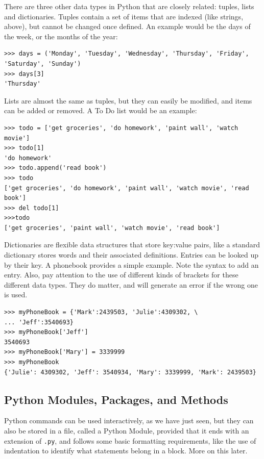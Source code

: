 There are three other data types in Python that are closely related: tuples, lists and dictionaries.  Tuples contain a set of items that are indexed (like strings, above), but cannot be changed once defined.  An example would be the days of the week, or the months of the year:

\begin{lstlisting}
>>> days = ('Monday', 'Tuesday', 'Wednesday', 'Thursday', 'Friday', 'Saturday', 'Sunday')
>>> days[3]
'Thursday'
\end{lstlisting}

Lists are almost the same as tuples, but they can easily be modified, and items can be added or removed. A To Do list would be an example:

\begin{lstlisting}
>>> todo = ['get groceries', 'do homework', 'paint wall', 'watch movie']
>>> todo[1]
'do homework'
>>> todo.append('read book')
>>> todo
['get groceries', 'do homework', 'paint wall', 'watch movie', 'read book']
>>> del todo[1]
>>>todo
['get groceries', 'paint wall', 'watch movie', 'read book']
\end{lstlisting}

Dictionaries are flexible data structures that store key:value pairs, like a standard dictionary stores words and their associated definitions.  Entries can be looked up by their key.  A phonebook provides a simple example.  Note the syntax to add an entry.  Also, pay attention to the use of different kinds of brackets for these different data types.  They do matter, and will generate an error if the wrong one is used.

\begin{lstlisting}
>>> myPhoneBook = {'Mark':2439503, 'Julie':4309302, \
... 'Jeff':3540693}
>>> myPhoneBook['Jeff']
3540693
>>> myPhoneBook['Mary'] = 3339999
>>> myPhoneBook
{'Julie': 4309302, 'Jeff': 3540934, 'Mary': 3339999, 'Mark': 2439503}
\end{lstlisting}

\subsection{Python Modules, Packages, and Methods}

Python commands can be used interactively, as we have just seen,  but they can also be stored in a file, called a Python Module, provided that it ends with an extension of \verb#.py#, and follows some basic formatting requirements, like the use of indentation to identify what statements belong in a block.  More on this later.

